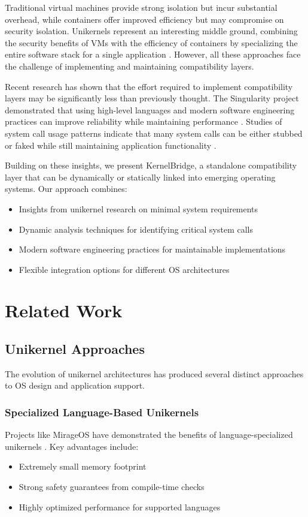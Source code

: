 \documentclass[conference]{IEEEtran}
\begin{document}
Traditional virtual machines provide strong isolation but incur substantial overhead, while containers offer improved efficiency but may compromise on security isolation. Unikernels represent an interesting middle ground, combining the security benefits of VMs with the efficiency of containers by specializing the entire software stack for a single application \cite{unikernels_vs_containers}. However, all these approaches face the challenge of implementing and maintaining compatibility layers.

Recent research has shown that the effort required to implement compatibility layers may be significantly less than previously thought. The Singularity project demonstrated that using high-level languages and modern software engineering practices can improve reliability while maintaining performance \cite{singularity}. Studies of system call usage patterns indicate that many system calls can be either stubbed or faked while still maintaining application functionality \cite{lefeuvre2024loupe}.

Building on these insights, we present KernelBridge, a standalone compatibility layer that can be dynamically or statically linked into emerging operating systems. Our approach combines:
\begin{itemize}
	\item Insights from unikernel research on minimal system requirements
	\item Dynamic analysis techniques for identifying critical system calls
	\item Modern software engineering practices for maintainable implementations
	\item Flexible integration options for different OS architectures
\end{itemize}

\section{Related Work}
\subsection{Unikernel Approaches}
The evolution of unikernel architectures has produced several distinct approaches to OS design and application support.

\subsubsection{Specialized Language-Based Unikernels}
Projects like MirageOS have demonstrated the benefits of language-specialized unikernels \cite{linux_kernel_clothing}. Key advantages include:
\begin{itemize}
	\item Extremely small memory footprint
	\item Strong safety guarantees from compile-time checks
	\item Highly optimized performance for supported languages
\end{itemize}
\end{document}
